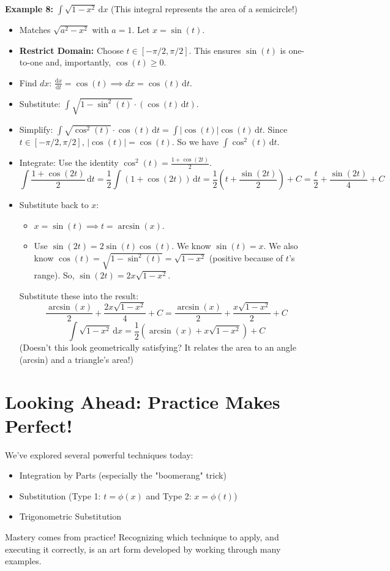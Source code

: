 \documentclass[11pt]{article}
\newcommand{\dx}{\,\mathrm{d}x} %
\newcommand{\dt}{\,\mathrm{d}t} %
\newcommand{\ddt}[1]{\frac{\mathrm{d}#1}{\mathrm{d}t}} %
\begin{document}
\textbf{Example 8:} $\int \sqrt{1-x^2} \dx$ (This integral represents the area of a semicircle!)
\begin{itemize}
    \item Matches $\sqrt{a^2 - x^2}$ with $a=1$. Let $x = \sin(t)$.
    \item \textbf{Restrict Domain:} Choose $t \in [-\pi/2, \pi/2]$. This ensures $\sin(t)$ is one-to-one and, importantly, $\cos(t) \ge 0$.
    \item Find $dx$: $\ddt{x} = \cos(t) \implies dx = \cos(t) \dt$.
    \item Substitute: $\int \sqrt{1-\sin^2(t)} \cdot (\cos(t) \dt)$.
    \item Simplify: $\int \sqrt{\cos^2(t)} \cdot \cos(t) \dt = \int |\cos(t)| \cos(t) \dt$. Since $t \in [-\pi/2, \pi/2]$, $|\cos(t)| = \cos(t)$. So we have $\int \cos^2(t) \dt$.
    \item Integrate: Use the identity $\cos^2(t) = \frac{1+\cos(2t)}{2}$.
    \[ \int \frac{1+\cos(2t)}{2} \dt = \frac{1}{2} \int (1+\cos(2t)) \dt = \frac{1}{2} \left( t + \frac{\sin(2t)}{2} \right) + C = \frac{t}{2} + \frac{\sin(2t)}{4} + C \]
    \item Substitute back to $x$:
        \begin{itemize}
            \item $x = \sin(t) \implies t = \arcsin(x)$.
            \item Use $\sin(2t) = 2\sin(t)\cos(t)$. We know $\sin(t)=x$. We also know $\cos(t) = \sqrt{1-\sin^2(t)} = \sqrt{1-x^2}$ (positive because of $t$'s range). So, $\sin(2t) = 2x\sqrt{1-x^2}$.
        \end{itemize}
        Substitute these into the result:
        \[ \frac{\arcsin(x)}{2} + \frac{2x\sqrt{1-x^2}}{4} + C = \frac{\arcsin(x)}{2} + \frac{x\sqrt{1-x^2}}{2} + C \]
        \[ \boxed{\int \sqrt{1-x^2} \dx = \frac{1}{2} \left( \arcsin(x) + x\sqrt{1-x^2} \right) + C} \]
        (Doesn't this look geometrically satisfying? It relates the area to an angle (arcsin) and a triangle's area!)
\end{itemize}

\section{Looking Ahead: Practice Makes Perfect!}

We've explored several powerful techniques today:
\begin{itemize}
    \item Integration by Parts (especially the "boomerang" trick)
    \item Substitution (Type 1: $t=\phi(x)$ and Type 2: $x=\phi(t)$)
    \item Trigonometric Substitution
\end{itemize}
Mastery comes from practice! Recognizing which technique to apply, and executing it correctly, is an art form developed by working through many examples.
\end{document}
